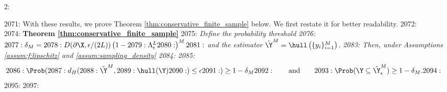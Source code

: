 2: \documentclass[12pt]{l4dc2022} %
\begin{document}
2071: With these results, we prove Theorem \ref{thm:conservative_finite_sample} below. We first restate it for better readability.
2072: \\[2mm]
2074: \textbf{Theorem \ref{thm:conservative_finite_sample}} 
2075:  \textit{Define the probability threshold
2076: $
2077: \delta_M= 
2078: D(\partial\X,\epsilon/(2L))\left(1 -
2079: 	\Lambda_{\epsilon}^{L}
2080: \right)^M
2081: $ and the estimator $\hat\Y^M=\hull\left(\{y_i\}_{i{=}1}^M\right)$.
2083: Then, under Assumptions \ref{assum:f:lipschitz} and \ref{assum:sampling_density} 
2084:   
2085: $$
2086: \Prob(
2087: d_H(
2088: \hat\Y^M, 
2089: \hull(\Y)
2090: )\leq \epsilon
2091: )\geq 1-\delta_M
2092: \qquad\text{and}\qquad
2093: \Prob(\Y\subseteq\hat\Y_\epsilon^M)\geq 1-\delta_M.
2094: $$}
2095: 
2097: \\
\end{document}
